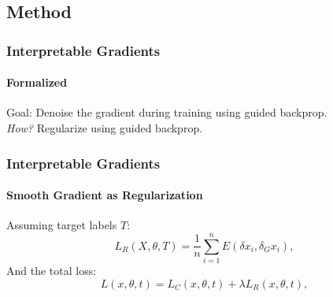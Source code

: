 \subsection*{Method}
\begin{frame}[c]
    \frametitle{Interpretable Gradients}    
    \framesubtitle{Formalized}
    \small
    Goal: Denoise the gradient during training using guided backprop.\\
    \emph{How?} Regularize using guided backprop.\\\pause
    
\end{frame}
\begin{frame}[t]
    \frametitle{Interpretable Gradients}
    \framesubtitle{Smooth Gradient as Regularization}
    \small
    Assuming target labels $T$:
    \begin{equation}
        L_R(X, \theta, T) = \frac{1}{n} \sum_{i=1}^n E(\delta x_i, \delta_G x_i),
    \end{equation}
    \pause
    And the total loss:
    \begin{equation}
        L(x, \theta, t) = L_C(x, \theta, t) + \lambda L_R(x, \theta, t),
    \label{eq:total}
    \end{equation}
\end{frame}

